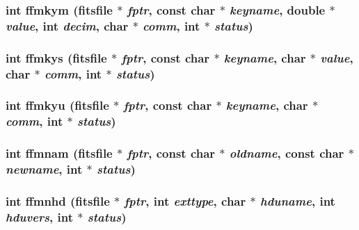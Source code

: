 \subsubsection{\setlength{\rightskip}{0pt plus 5cm}int ffmkym (\bf{fitsfile} $\ast$ {\em fptr}, const char $\ast$ {\em keyname}, double $\ast$ {\em value}, int {\em decim}, char $\ast$ {\em comm}, int $\ast$ {\em status})}\label{fitsio_8h_2e1ce1cd4c5dec3d5966edd8febeb9c0}


\subsubsection{\setlength{\rightskip}{0pt plus 5cm}int ffmkys (\bf{fitsfile} $\ast$ {\em fptr}, const char $\ast$ {\em keyname}, char $\ast$ {\em value}, char $\ast$ {\em comm}, int $\ast$ {\em status})}\label{fitsio_8h_4de4d8a5bcc63ae6b2aa1162d5173147}


\subsubsection{\setlength{\rightskip}{0pt plus 5cm}int ffmkyu (\bf{fitsfile} $\ast$ {\em fptr}, const char $\ast$ {\em keyname}, char $\ast$ {\em comm}, int $\ast$ {\em status})}\label{fitsio_8h_a130f6faad71e05cd648b6f0443a6fc1}


\subsubsection{\setlength{\rightskip}{0pt plus 5cm}int ffmnam (\bf{fitsfile} $\ast$ {\em fptr}, const char $\ast$ {\em oldname}, const char $\ast$ {\em newname}, int $\ast$ {\em status})}\label{fitsio_8h_b7f97743a5818de567c3815c43852711}


\subsubsection{\setlength{\rightskip}{0pt plus 5cm}int ffmnhd (\bf{fitsfile} $\ast$ {\em fptr}, int {\em exttype}, char $\ast$ {\em hduname}, int {\em hduvers}, int $\ast$ {\em status})}\label{fitsio_8h_84dd226ce5315b62afba4631346d486f}


